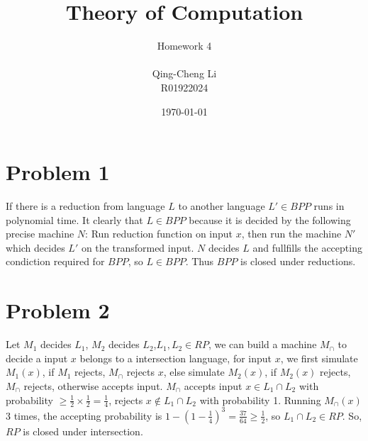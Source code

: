 \documentclass[11pt]{article}
\title{\textbf{Theory of Computation}}
\author{Homework 4\\
					\\
		Qing-Cheng Li\\
		R01922024}
\date{\today}
\begin{document}
\maketitle
\section{Problem 1}
If there is a reduction from language $L$ to another language $L' \in BPP$ runs in polynomial time. It clearly that $L \in BPP$ because it is decided by the following precise machine $N$: Run reduction function on input $x$, then run the machine $N'$ which decides $L'$ on the transformed input. $N$ decides $L$ and fullfills the accepting condiction required for $BPP$, so $L \in BPP$. Thus $BPP$ is closed under reductions.

\section{Problem 2}
Let $M_1$ decides $L_1$, $M_2$ decides $L_2$,$L_1,L_2 \in RP$, we can build a machine $M_{\cap}$ to decide a input $x$ belongs to a intersection language, for input $x$, we first simulate $M_1(x)$, if $M_1$ rejects, $M_{\cap}$ rejects $x$, else simulate $M_2(x)$, if $M_2(x)$ rejects, $M_{\cap}$ rejects, otherwise accepts input. $M_{\cap}$ accepts input $x \in L_1 \cap L_2$ with probability $\geq \frac{1}{2}\times\frac{1}{2}=\frac{1}{4}$, rejects $x \not \in L_1 \cap L_2$ with probability 1. Running $M_{\cap}(x)$ 3 times, the accepting probability is $1 - (1-\frac{1}{4})^3 = \frac{37}{64} \geq \frac{1}{2}$, so $L_1 \cap L_2 \in RP$. So, $RP$ is closed under intersection.
\end{document}
